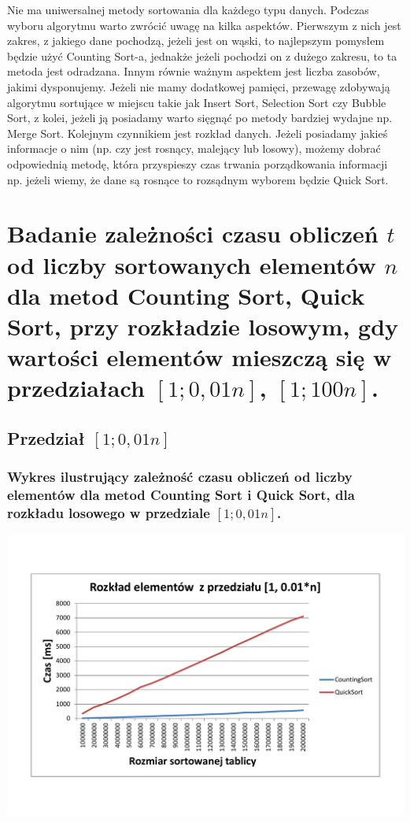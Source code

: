 \documentclass[polish,polish,a4paper]{article}
\begin{document}
\begin{spacing}{1.5}
Nie ma uniwersalnej metody sortowania dla każdego typu danych. Podczas wyboru algorytmu warto zwrócić uwagę na kilka aspektów. Pierwszym z nich jest zakres, z jakiego dane pochodzą, jeżeli jest on wąski, to najlepszym pomysłem będzie użyć Counting Sort-a, jednakże jeżeli pochodzi on z dużego zakresu, to ta metoda jest odradzana. Innym równie ważnym aspektem jest liczba zasobów, jakimi dysponujemy. Jeżeli nie mamy dodatkowej pamięci, przewagę zdobywają algorytmu sortujące w miejscu takie jak Insert Sort, Selection Sort czy Bubble Sort, z kolei, jeżeli ją posiadamy warto sięgnąć po metody bardziej wydajne np. Merge Sort. Kolejnym czynnikiem jest rozkład danych. Jeżeli posiadamy jakieś informacje o nim (np. czy jest rosnący, malejący lub losowy), możemy dobrać odpowiednią metodę, która przyspieszy czas trwania porządkowania informacji np. jeżeli wiemy, że dane są rosnące to rozsądnym wyborem będzie Quick Sort.

\section{Badanie zależności czasu obliczeń $t$ od liczby sortowanych elementów $n$ dla metod Counting Sort, Quick Sort, przy rozkładzie losowym, gdy wartości elementów mieszczą się w przedziałach  $ [1;0,01n] $, $ [1;100n] $. }

\subsection{Przedział $[1;0,01n]$}

\subsubsection*{Wykres ilustrujący zależność czasu obliczeń od liczby elementów dla metod Counting Sort i  Quick Sort, dla rozkładu losowego w przedziale $[1;0,01n]$.}
	
	\begin{minipage}[H]{\textwidth}
		\begin{center}
			\includegraphics[scale=0.6]{zad4001n.pdf}
			\label{fig:zad4001n}
		\end{center}
	\end{minipage}


\end{spacing}
\end{document}
